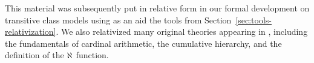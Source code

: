 This material was subsequently put in relative form in our formal
development on transitive class models \cite{Transitive_Models-AFP}
using as an aid the tools from
Section~\ref{sec:tools-relativization}. We also relativized many
original theories appearing in , including the
fundamentals of cardinal arithmetic, the cumulative hierarchy, and the
definition of the $\aleph_{}$ function.


